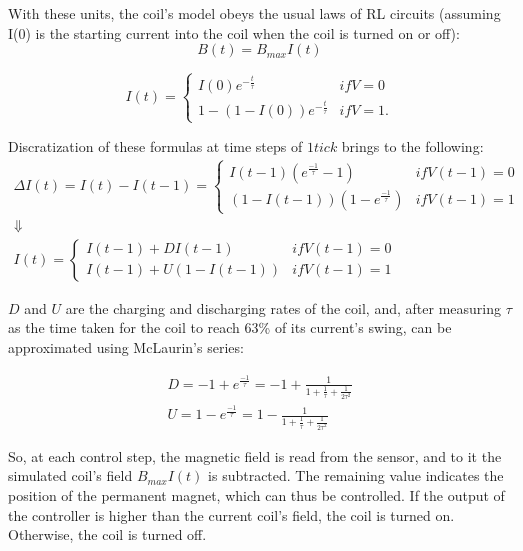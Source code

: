 With these units, the coil's model obeys the usual laws of RL circuits (assuming I(0) is the starting current into the coil when the coil is turned on or off):
\[
    B(t)=B_{max}I(t)
\]

\[
  I(t) = \left\{
    \begin{array}{lr}
      I(0)e^{-\frac{t}{\tau}} & if V = 0 \\
      1-(1-I(0))e^{-\frac{t}{\tau}} & if V = 1.
    \end{array} 
  \right.
\]


Discratization of these formulas at time steps of $1tick$ brings to the following:
\[
  \begin{array}{c}
  \Delta I(t) = I(t) - I(t-1) = \left\{
    \begin{array}{lr}
      I(t-1)(e^{\frac{-1}{\tau}}-1) & if V(t-1) = 0 \\
      (1-I(t-1))(1-e^{\frac{-1}{\tau}}) & if V(t-1) = 1
    \end{array}
  \right. \\
  \Downarrow \\
  I(t) = \left\{
    \begin{array}{lr}
      I(t-1)+DI(t-1) & if V(t-1) = 0 \\
      I(t-1)+U(1-I(t-1)) & if V(t-1) = 1
    \end{array}
  \right.
  \end{array}
\]

$D$ and $U$ are the charging and discharging rates of the coil, and, after measuring $\tau$ as the time taken for the coil to reach 63\% of its current's swing, can be approximated using McLaurin's series:

\[
  \begin{array}{c}
    D=-1+e^{\frac{-1}{\tau}}=-1+\frac{1}{1+\frac{1}{\tau}+\frac{1}{2\tau^2}} \\
    U=1-e^{\frac{-1}{\tau}}=1-\frac{1}{1+\frac{1}{\tau}+\frac{1}{2\tau^2}}
  \end{array}
\]

So, at each control step, the magnetic field is read from the sensor, and to it the simulated coil's field $B_{max}I(t)$ is subtracted. The remaining value indicates the position of the permanent magnet, which can thus be controlled. If the output of the controller is higher than the current coil's field, the coil is turned on. Otherwise, the coil is turned off.

